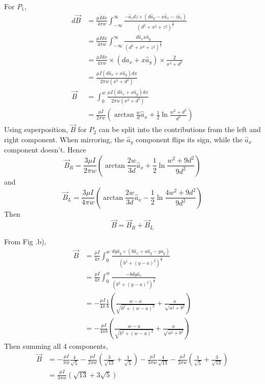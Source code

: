 \documentclass[answers]{exam}
\begin{document}
\begin{questions}
\begin{solution}
    For $P_1$,
    \begin{align*}
        d\vec B &= \frac{\mu Idx}{4\pi w} \int_{-\infty}^\infty \frac{-\hat a_zdz \times (d\hat a_y - x\hat a_x - z\hat a_z)}{(d^2+x^2+z^2)^{\frac{3}{2}}} \\
                &= \frac{\mu Idx}{4\pi w} \int_{-\infty}^\infty \frac{d\hat a_x x\hat a_y}{(d^2+x^2+z^2)^{\frac{3}{2}}} \\
                &= \frac{\mu Idx}{4\pi w} \times (d\hat a_x + x\hat a_y) \times \frac{2}{x^2+d^2} \\
                &= \frac{\mu I(d\hat a_x + x\hat a_y) dx}{2\pi w(x^2+d^2)} \\
        \vec B &= \int_0^w \frac{\mu I(d\hat a_x + x\hat a_y) dx}{2\pi w(x^2+d^2)} \\
               &= \frac{\mu I}{2\pi w} \left(\arctan\frac{w}{d} \hat a_x + \frac{1}{2} \ln\frac{w^2+d^2}{d^2}\right)
    \end{align*}
    Using superposition, $\vec B$ for $P_2$ can be split into the contributions from the left and right component. When mirroring, the $\hat a_y$ component flips its sign, while the $\hat a_x$ component doesn't. Hence
    $$\vec B_R = \frac{3\mu I}{2\pi w} \left(\arctan\frac{2w}{3d} \hat a_x + \frac{1}{2} \ln\frac{w^2+9d^2}{9d^2}\right)$$
    and
    $$ \vec B_L = \frac{3\mu I}{4\pi w} \left(\arctan\frac{2w}{3d} \hat a_x - \frac{1}{2} \ln\frac{4w^2+9d^2}{9d^2}\right)$$
    Then
    $$\vec B = \vec B_R + \vec B_L$$
\end{solution}


\begin{solution}
    From Fig .b),
    \begin{align*}
        \vec B &= \frac{\mu I}{4\pi} \int_0^w \frac{dy\hat a_y \times (b\hat a_x + a\hat a_y - y\hat a_y)}{(b^2 + (y-a)^2)^{\frac{3}{2}}} \\
               &= \frac{\mu I}{4\pi} \int_0^w \frac{-bdy\hat a_z}{(b^2 + (y-a)^2)^{\frac{3}{2}}} \\
               &= -\frac{\mu I}{4\pi} \frac{1}{b}\left(\frac{w-a}{\sqrt{b^2+(w-a)^2}} + \frac{a}{\sqrt{a^2+b^2}}\right) \\
               &= -\frac{\mu I}{4\pi b}\left(\frac{w-a}{\sqrt{b^2+(w-a)^2}} + \frac{a}{\sqrt{a^2+b^2}}\right)
    \end{align*}
    Then summing all 4 components,
    \begin{align*}
        \vec B &= -\frac{\mu I}{\pi w}\frac{4}{\sqrt{5}} -\frac{\mu I}{2\pi w}\left(\frac{3}{\sqrt{13}} + \frac{1}{\sqrt{5}}\right) - \frac{\mu I}{3\pi w}\frac{4}{\sqrt{13}} - \frac{\mu I}{2\pi w} \left(\frac{1}{\sqrt{5}} + \frac{3}{\sqrt{13}}\right) \\
               &= \frac{\mu I}{3\pi w}(\sqrt{13} + 3\sqrt{5})
    \end{align*}
\end{solution}


\end{questions}
\end{document}
